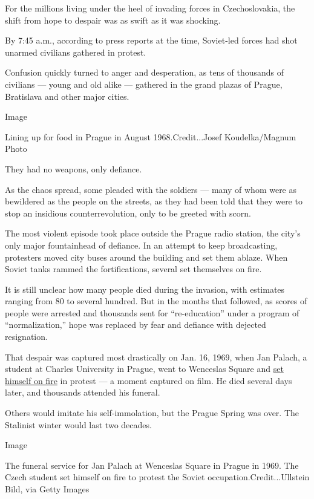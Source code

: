 For the millions living under the heel of invading forces in
Czechoslovakia, the shift from hope to despair was as swift as it was
shocking.

By 7:45 a.m., according to press reports at the time, Soviet-led forces
had shot unarmed civilians gathered in protest.

Confusion quickly turned to anger and desperation, as tens of thousands
of civilians --- young and old alike --- gathered in the grand plazas of
Prague, Bratislava and other major cities.

Image

Lining up for food in Prague in August 1968.Credit...Josef
Koudelka/Magnum Photo

They had no weapons, only defiance.

As the chaos spread, some pleaded with the soldiers --- many of whom
were as bewildered as the people on the streets, as they had been told
that they were to stop an insidious counterrevolution, only to be
greeted with scorn.

The most violent episode took place outside the Prague radio station,
the city's only major fountainhead of defiance. In an attempt to keep
broadcasting, protesters moved city buses around the building and set
them ablaze. When Soviet tanks rammed the fortifications, several set
themselves on fire.

It is still unclear how many people died during the invasion, with
estimates ranging from 80 to several hundred. But in the months that
followed, as scores of people were arrested and thousands sent for
``re-education'' under a program of ``normalization,'' hope was replaced
by fear and defiance with dejected resignation.

That despair was captured most drastically on Jan. 16, 1969, when Jan
Palach, a student at Charles University in Prague, went to Wenceslas
Square and
\href{http://www.praguemorning.cz/czech-student-jan-palach-burns-himself-to-death-in-anti-soviet-protest-Es2oY7kyqA}{set
himself on fire} in protest --- a moment captured on film. He died
several days later, and thousands attended his funeral.

Others would imitate his self-immolation, but the Prague Spring was
over. The Stalinist winter would last two decades.

Image

The funeral service for Jan Palach at Wenceslas Square in Prague in
1969. The Czech student set himself on fire to protest the Soviet
occupation.Credit...Ullstein Bild, via Getty Images

